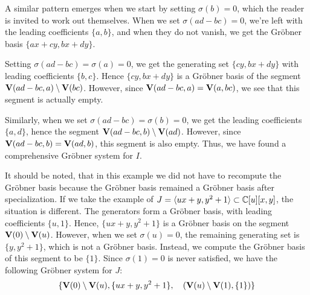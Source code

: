 \begin{example}
  A similar pattern emerges when we start by setting $\sigma(b) = 0$, which the reader is invited to work out themselves. When we set $\sigma(ad - bc) = 0$, we're left with the leading coefficients $\{a, b\}$, and when they do not vanish, we get the Gröbner basis $\{ax + cy, bx + dy\}$.

  Setting $\sigma(ad - bc) = \sigma(a) = 0$, we get the generating set $\{cy, bx + dy\}$ with leading coefficients $\{b, c\}$. Hence $\{cy, bx + dy\}$ is a Gröbner basis of the segment $\operatorname{\mathbf V}(ad - bc, a) \setminus \operatorname{\mathbf V}(bc)$. However, since $\operatorname{\mathbf V}(ad - bc, a) = \operatorname{\mathbf V}(a, bc)$, we see that this segment is actually empty.

  Similarly, when we set $\sigma(ad - bc) = \sigma(b) = 0$, we get the leading coefficients $\{a, d\}$, hence the segment $\operatorname{\mathbf V}(ad - bc, b) \setminus \operatorname{\mathbf V}(ad)$. However, since $\operatorname{\mathbf V}(ad - bc, b) = \operatorname{\mathbf V}(ad, b)$, this segment is also empty. Thus, we have found a comprehensive Gröbner system for $I$.

  It should be noted, that in this example we did not have to recompute the Gröbner basis because the Gröbner basis remained a Gröbner basis after specialization. If we take the example of $J = \langle ux + y, y^{2} + 1 \rangle \subset \mathbb{C}[u][x, y]$, the situation is different. The generators form a Gröbner basis, with leading coefficients $\{u, 1\}$. Hence, $\{ux + y, y^{2} + 1\}$ is a Gröbner basis on the segment $\operatorname{\mathbf V}(0) \setminus \operatorname{\mathbf V}(u)$. However, when we set $\sigma(u) = 0$, the remaining generating set is $\{y, y^{2} + 1\}$, which is not a Gröbner basis. Instead, we compute the Gröbner basis of this segment to be $\{1\}$. Since $\sigma(1) = 0$ is never satisfied, we have the following Gröbner system for $J$:
  \[\{\operatorname{\mathbf V}(0) \setminus \operatorname{\mathbf V}(u), \{ux + y, y^{2} + 1\}, \quad (\operatorname{\mathbf V}(u) \setminus \operatorname{\mathbf V}(1), \{1\})\}\]
\end{example}


